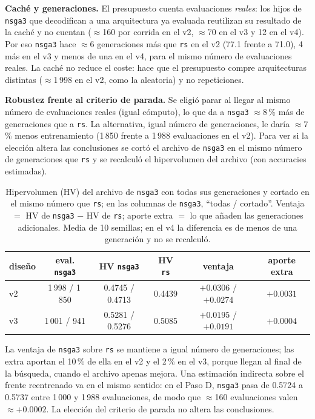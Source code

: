 \documentclass[11pt,a4paper]{article}
\begin{document}
\textbf{Caché y generaciones.} El presupuesto cuenta evaluaciones \emph{reales}: los hijos de \texttt{nsga3} que decodifican a una arquitectura ya evaluada reutilizan su resultado de la caché y no cuentan ($\approx$160 por corrida en el v2, $\approx$70 en el v3 y 12 en el v4). Por eso \texttt{nsga3} hace $\approx$6 generaciones más que \texttt{rs} en el v2 (77.1 frente a 71.0), 4 más en el v3 y menos de una en el v4, para el mismo número de evaluaciones reales. La caché no reduce el coste: hace que el presupuesto compre arquitecturas distintas ($\approx$1\,998 en el v2, como la aleatoria) y no repeticiones.

\textbf{Robustez frente al criterio de parada.} Se eligió parar al llegar al mismo número de evaluaciones reales (igual cómputo), lo que da a \texttt{nsga3} $\approx$8\,\% más de generaciones que a \texttt{rs}. La alternativa, igual número de generaciones, le daría $\approx$7\,\% menos entrenamiento (1\,850 frente a 1\,988 evaluaciones en el v2). Para ver si la elección altera las conclusiones se cortó el archivo de \texttt{nsga3} en el mismo número de generaciones que \texttt{rs} y se recalculó el hipervolumen del archivo (con accuracies estimadas).
\begin{table}[h]
\centering\footnotesize
\setlength{\tabcolsep}{4pt}
\begin{tabular}{lccccc}
\toprule
diseño & eval. \texttt{nsga3} & HV \texttt{nsga3} & HV \texttt{rs} & ventaja & aporte extra\\
\midrule
v2 & 1\,998 / 1\,850 & 0.4745 / 0.4713 & 0.4439 & $+0.0306$ / $+0.0274$ & $+0.0031$\\
v3 & 1\,001 / 941 & 0.5281 / 0.5276 & 0.5085 & $+0.0195$ / $+0.0191$ & $+0.0004$\\
\bottomrule
\end{tabular}
\caption{Hipervolumen (HV) del archivo de \texttt{nsga3} con todas sus generaciones y cortado en el mismo número que \texttt{rs}; en las columnas de \texttt{nsga3}, ``todas / cortado''. Ventaja $=$ HV de \texttt{nsga3} $-$ HV de \texttt{rs}; aporte extra $=$ lo que añaden las generaciones adicionales. Media de 10 semillas; en el v4 la diferencia es de menos de una generación y no se recalculó.}
\label{tab:robustez}
\end{table}
La ventaja de \texttt{nsga3} sobre \texttt{rs} se mantiene a igual número de generaciones; las extra aportan el 10\,\% de ella en el v2 y el 2\,\% en el v3, porque llegan al final de la búsqueda, cuando el archivo apenas mejora. Una estimación indirecta sobre el frente reentrenado va en el mismo sentido: en el Paso D, \texttt{nsga3} pasa de 0.5724 a 0.5737 entre 1\,000 y 1\,988 evaluaciones, de modo que $\approx$160 evaluaciones valen $\approx+0.0002$. La elección del criterio de parada no altera las conclusiones.
\end{document}
